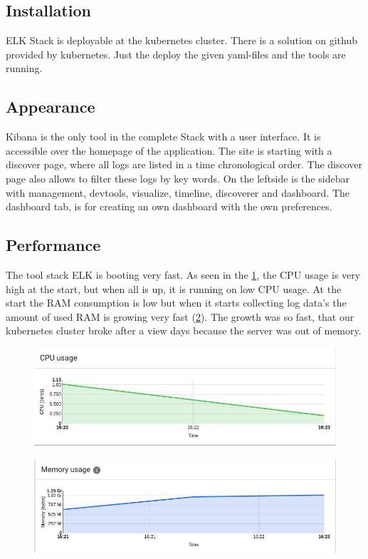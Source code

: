 \subsection{Installation}
ELK Stack is deployable at the kubernetes cluster. There is a solution on github provided by kubernetes. Just the deploy the given yaml-files and the tools are running.
\subsection{Appearance}%
Kibana is the only tool in the complete Stack with a user interface. It is accessible over the homepage of the application. The site is starting with a discover page, where all logs are listed in a time chronological order. The discover page also allows to filter these logs by key words. On the leftside is the sidebar with management, devtools, visualize, timeline, discoverer and dashboard. The dashboard tab, is for creating an own dashboard with the own preferences.
\subsection{Performance}
The tool stack ELK is booting very fast. As seen in the \cref{fig:ELK_CPU}, the CPU usage is very high at the start, but when all is up, it is running on low CPU usage. At the start the RAM consumption is low but when it starts collecting log data's the amount of used RAM is growing very fast (\cref{fig:ELK_MEM}). The growth was so fast, that our kubernetes cluster broke after a view days because the server was out of memory.
\begin{figure}
	\centering
	\includegraphics[width=0.5\linewidth]{Bilder/Performance/ELK_CPU}
	\caption{}
	\label{fig:ELK_CPU}
\end{figure}
\begin{figure}
	\centering
	\includegraphics[width=0.5\linewidth]{Bilder/Performance/ELK_MEM}
	\caption{}
	\label{fig:ELK_MEM}
\end{figure}
